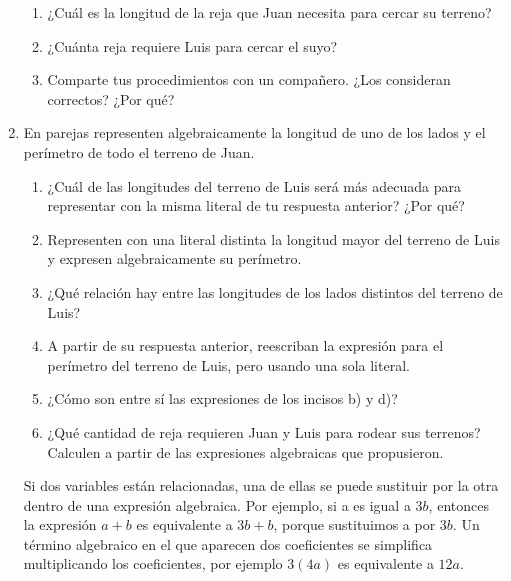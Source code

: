 \begin{enumerate}
          \begin{enumerate}
              \item ¿Cuál es la longitud de la reja que Juan necesita para cercar su terreno?
              \item ¿Cuánta reja requiere Luis para cercar el suyo?
              \item Comparte tus procedimientos con un compañero. ¿Los consideran correctos? ¿Por qué?
          \end{enumerate}
    \item En parejas representen algebraicamente la longitud de uno de los lados y el perímetro de todo el terreno de Juan.
          \begin{enumerate}
              \item ¿Cuál de las longitudes del terreno de Luis será más adecuada para representar con la misma literal de tu
                    respuesta anterior? ¿Por qué?
              \item Representen con una literal distinta la longitud mayor del terreno de Luis y expresen algebraicamente su
                    perímetro.
              \item ¿Qué relación hay entre las longitudes de los lados distintos del terreno de Luis?
              \item A partir de su respuesta anterior, reescriban la expresión para el perímetro del terreno de Luis,
                    pero usando una sola literal.
              \item ¿Cómo son entre sí las expresiones de los incisos b) y d)?
              \item ¿Qué cantidad de reja requieren Juan y Luis para rodear sus terrenos? Calculen a partir de las
                    expresiones algebraicas que propusieron.
          \end{enumerate}

          \begin{boxH}
              Si dos variables están relacionadas, una de ellas se puede sustituir por la otra dentro
              de una expresión algebraica. Por ejemplo, si a es igual a $3b$, entonces la expresión
              $a + b$ es equivalente a $3b + b$, porque sustituimos a por $3b$.
              Un término algebraico en el que aparecen dos coeficientes se simplifica multiplicando
              los coeficientes, por ejemplo $3(4a)$ es equivalente a $12a$.
          \end{boxH}


\end{enumerate}
